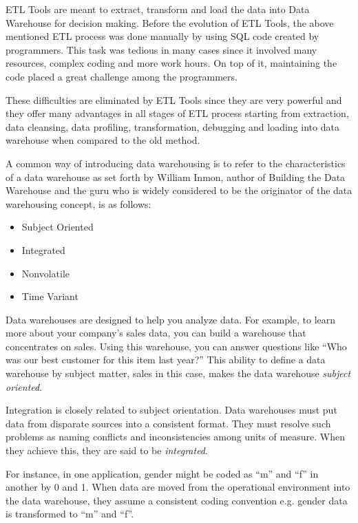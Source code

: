 ETL Tools are meant to extract, transform and load the data into Data Warehouse for decision
making. Before the evolution of ETL Tools, the above mentioned ETL process was done manually
by using SQL code created by programmers. This task was tedious in many cases since it involved
many resources, complex coding and more work hours. On top of it, maintaining the code placed
a great challenge among the programmers.

These difficulties are eliminated by ETL Tools since they are very powerful and they offer
many advantages in all stages of ETL process starting from extraction, data cleansing, data profiling,
transformation, debugging and loading into data warehouse when compared to the old method.

A common way of introducing data warehousing is to refer to the characteristics of a data
warehouse as set forth by William Inmon, author of Building the Data Warehouse and the guru who
is widely considered to be the originator of the data warehousing concept, is as follows:
\begin{multicols}{2}
	\begin{itemize}
		\item Subject Oriented
		\item Integrated
		\item Nonvolatile
		\item Time Variant
	\end{itemize}
\end{multicols}


Data warehouses are designed to help you analyze data. For example, to learn more about your
company’s sales data, you can build a warehouse that concentrates on sales. Using this warehouse,
you can answer questions like “Who was our best customer for this item last year?” This ability
to define a data warehouse by subject matter, sales in this case, makes the data warehouse \textit{subject
oriented}.

Integration is closely related to subject orientation. Data warehouses must put data from
disparate sources into a consistent format. They must resolve such problems as naming conflicts
and inconsistencies among units of measure. When they achieve this, they are said to be \textit{integrated}.

For instance, in one application, gender might be coded as “m” and “f” in another by 0 and 1. When
data are moved from the operational environment into the data warehouse, they assume a consistent
coding convention e.g. gender data is transformed to “m” and “f”.

